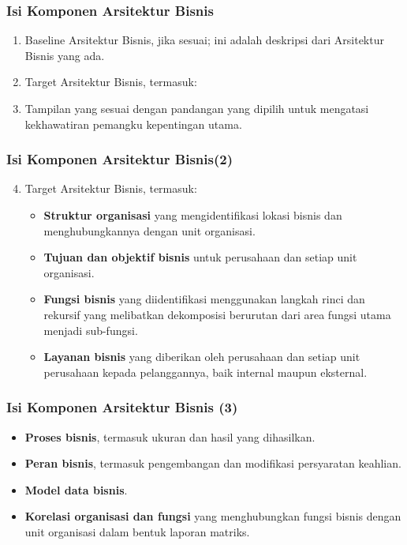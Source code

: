 \documentclass[aspectratio=169, table]{beamer}
\begin{document}
	\begin{frame}
		\frametitle{Isi Komponen Arsitektur Bisnis}
		\begin{enumerate}
			\item Baseline Arsitektur Bisnis, jika sesuai; ini adalah deskripsi dari Arsitektur Bisnis yang ada.
			\item Target Arsitektur Bisnis, termasuk:
			\item Tampilan yang sesuai dengan pandangan yang dipilih untuk mengatasi kekhawatiran pemangku kepentingan utama.
		\end{enumerate}
	\end{frame}

		\begin{frame}
		\frametitle{Isi Komponen Arsitektur Bisnis(2)}
		\begin{enumerate}
			\setcounter{enumi}{3}
			\item Target Arsitektur Bisnis, termasuk:
			\begin{itemize}
				\item \textbf{Struktur organisasi} yang mengidentifikasi lokasi bisnis dan menghubungkannya dengan unit organisasi.
				\item \textbf{Tujuan dan objektif bisnis} untuk perusahaan dan setiap unit organisasi.
				\item \textbf{Fungsi bisnis} yang diidentifikasi menggunakan langkah rinci dan rekursif yang melibatkan dekomposisi berurutan dari area fungsi utama menjadi sub-fungsi.
				\item \textbf{Layanan bisnis} yang diberikan oleh perusahaan dan setiap unit perusahaan kepada pelanggannya, baik internal maupun eksternal.
			\end{itemize}
		\end{enumerate}
	\end{frame}


	\begin{frame}
		\frametitle{Isi Komponen Arsitektur Bisnis (3)}
			\begin{itemize}
                \item \textbf{Proses bisnis}, termasuk ukuran dan hasil yang dihasilkan.
				\item \textbf{Peran bisnis}, termasuk pengembangan dan modifikasi persyaratan keahlian.
				\item \textbf{Model data bisnis}.
				\item \textbf{Korelasi organisasi dan fungsi} yang menghubungkan fungsi bisnis dengan unit organisasi dalam bentuk laporan matriks.
			\end{itemize}
	\end{frame}
\end{document}
